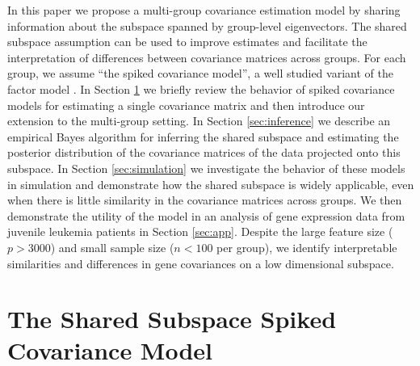 \documentclass[12pt]{article}
\begin{document}
In this paper we propose a multi-group covariance estimation model by
sharing information about the subspace spanned by group-level
eigenvectors.  The shared subspace assumption can be used to improve
estimates and facilitate the interpretation of differences between
covariance matrices across groups.  For each group, we assume ``the
spiked covariance model'', a well studied variant of the factor model
\citep{Johnstone2001}.  In Section \ref{sec:shared} we briefly review
the behavior of spiked covariance models for estimating a single
covariance matrix and then introduce our extension to the multi-group
setting.  In Section \ref{sec:inference} we describe an empirical
Bayes algorithm for inferring the shared subspace and estimating the
posterior distribution of the covariance matrices of the data
projected onto this subspace.  In Section \ref{sec:simulation} we
investigate the behavior of these models in simulation and demonstrate
how the shared subspace is widely applicable, even when there is
little similarity in the covariance matrices across groups.  We then
demonstrate the utility of the model in an analysis of gene expression
data from juvenile leukemia patients in Section \ref{sec:app}.  Despite the
large feature size ($p > 3000$) and small sample size ($n < 100$ per
group), we identify interpretable similarities and differences in gene
covariances on a low dimensional subspace.

\section{The Shared Subspace Spiked Covariance Model}
\label{sec:shared}

\end{document}

